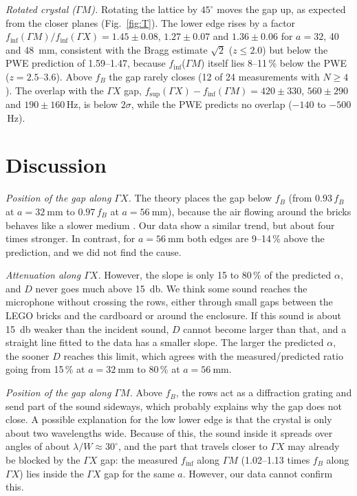 \documentclass[9pt,a4paper,twocolumn]{extarticle}
\newcommand{\umm}{\milli\metre}
\newcommand{\udB}{\decibel}
\newcommand{\GX}{\ensuremath{\Gamma X}}
\newcommand{\GM}{\ensuremath{\Gamma M}}
\newcommand{\finf}{\ensuremath{f_{\mathrm{inf}}}}
\newcommand{\fsup}{\ensuremath{f_{\mathrm{sup}}}}
\begin{document}
\emph{Rotated crystal (\GM).} Rotating the lattice by $45^\circ$ moves the gap up, as expected from the
closer planes (Fig.~\ref{fig:T}). The lower edge rises by a factor
$\finf(\GM)/\finf(\GX)=1.45\pm0.08$, $1.27\pm0.07$ and $1.36\pm0.06$ for $a=32$, 40 and \SI{48}{\umm}, consistent with
the Bragg estimate $\sqrt2$ ($z\le2.0$) but below the PWE prediction of 1.59--1.47, because \finf(\GM) itself
lies 8--11\,\% below the PWE ($z=2.5$--3.6). Above $f_B$ the gap rarely closes (12 of 24 measurements with
$N\ge4$). The overlap with the \GX{} gap,
$\fsup(\GX)-\finf(\GM)=420\pm330$, $560\pm290$ and $190\pm160$\,Hz, is below $2\sigma$, while the PWE
predicts no overlap ($-140$ to $-500$\,Hz).


\section{Discussion}
\emph{Position of the gap along \GX.} The theory places the gap below $f_B$ (from $0.93\,f_B$ at $a=\SI{32}{\umm}$ to $0.97\,f_B$ at $a=\SI{56}{\umm}$), because the air flowing around the bricks behaves like a slower medium \cite{krokhin}. Our data show a similar trend, but about four times stronger. In contrast, for $a=\SI{56}{\umm}$ both edges are 9--14\,\% above the prediction, and we did not find the cause.

\emph{Attenuation along \GX.} However, the slope is only 15 to 80\,\% of the predicted $\alpha$, and $D$ never goes much above \SI{15}{\udB}. We think some sound reaches the microphone without crossing the rows, either through small gaps between the LEGO bricks and the cardboard or around the enclosure. If this sound is about \SI{15}{\udB} weaker than the incident sound, $D$ cannot become larger than that, and a straight line fitted to the data has a smaller slope. The larger the predicted $\alpha$, the sooner $D$ reaches this limit, which agrees with the measured/predicted ratio going from 15\,\% at $a=\SI{32}{\umm}$ to 80\,\% at $a=\SI{56}{\umm}$.

\emph{Position of the gap along \GM.} Above $f_B$, the rows act as a diffraction grating and send part of the sound sideways, which probably explains why the gap does not close. A possible explanation for the low lower edge is that the crystal is only about two wavelengths wide. Because of this, the sound inside it spreads over angles of about $\lambda/W\approx30^\circ$, and the part that travels closer to \GX{} may already be blocked by the \GX{} gap: the measured \finf{} along \GM{} (1.02--1.13 times $f_B$ along \GX) lies inside the \GX{} gap for the same $a$. However, our data cannot confirm this.
\end{document}

